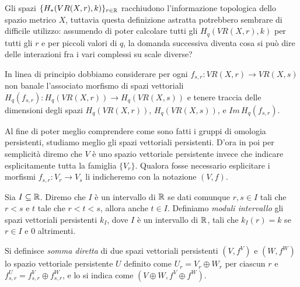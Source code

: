 Gli spazi $\{H_*(VR(X,r),k)\}_{r\in\mathbb{R}}$ racchiudono l'informazione topologica dello spazio metrico $X$, tuttavia questa definizione astratta potrebbero sembrare di difficile utilizzo: assumendo di poter calcolare tutti gli $H_q(VR(X,r),k)$ per tutti gli $r$ e per piccoli valori di $q$, la domanda successiva diventa cosa si può dire delle interazioni fra i vari complessi su scale diverse?

\begin{sloppypar}
  In linea di principio dobbiamo considerare per ogni ${f_{s,r}:VR(X,r)\to VR(X,s)}$ non banale l'associato morfismo di spazi vettoriali ${H_q(f_{s,r}):H_q(VR(X,r))\to H_q(VR(X,s))}$ e tenere traccia delle dimensioni degli spazi $H_q(VR(X,r))$, $H_q(VR(X,s))$, e $Im\,H_q(f_{s,r})$.
\end{sloppypar}

Al fine di poter meglio comprendere come sono fatti i gruppi di omologia persistenti, studiamo meglio gli spazi vettoriali persistenti. D'ora in poi per semplicità diremo che $V$ è uno spazio vettoriale persistente invece che indicare esplicitamente tutta la famiglia $\{V_r\}$. Qualora fosse necessario esplicitare i morfismi $f_{s,r}:V_r\to V_s$ li indicheremo con la notazione $(V,f)$.

\begin{definition}
  Sia $I\subseteq \mathbb{R}$. Diremo che $I$ è un intervallo di $\mathbb{R}$ se dati comunque $r,s\in I$ tali che $r<s$ e $t$ tale che $r<t<s$, allora anche $t\in I$. Definiamo \emph{moduli intervallo} gli spazi vettoriali persistenti $k_I$, dove $I$ è un intervallo di $\mathbb{R}$, tali che $k_I(r) = k$ se $r\in I$ e $0$ altrimenti.
\end{definition}

\begin{definition}
  Si definisce \emph{somma diretta} di due spazi vettoriali persistenti $(V,f^V)$ e $(W,f^W)$ lo spazio vettoriale persistente $U$ definito come $U_r = V_r\oplus W_r$ per ciascun $r$ e $f^U_{s,r} = f^V_{s,r}\oplus f^W_{s,r}$, e lo si indica come $(V\oplus W,f^V\oplus f^W)$.
\end{definition}

